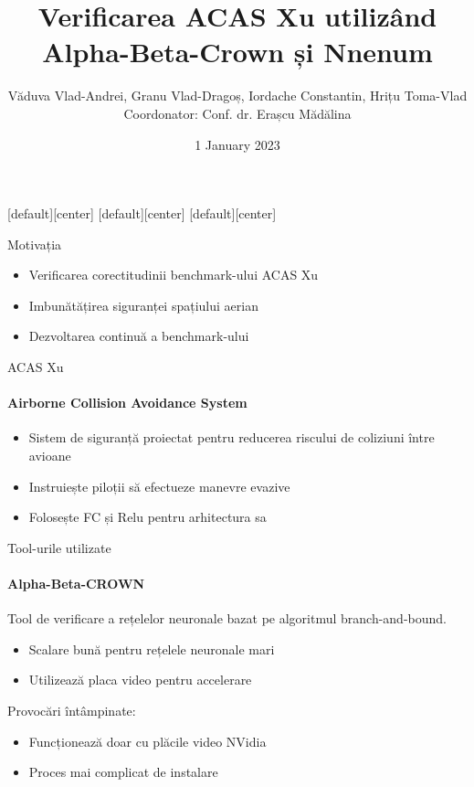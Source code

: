 \documentclass[aspectratio=169]{beamer}
\title{Verificarea ACAS Xu utilizând Alpha-Beta-Crown și Nnenum}
\author{Văduva Vlad-Andrei, Granu Vlad-Dragoș, Iordache Constantin, Hrițu Toma-Vlad
\small Coordonator: Conf. dr. Erașcu Mădălina}
\institute[rtk]{Universitatea de Vest din Timișoara}
\date{1 January 2023}
\begin{document}
  \settitlepagestyle
  
  
  [default][center]
  [default][center]
  [default][center]
  
	\maketitle

  \begin{frame}{Motivația}
    \begin{itemize}
      \item Verificarea corectitudinii benchmark-ului ACAS Xu 
      \newline
      \item Imbunătățirea siguranței spațiului aerian
      \newline
      \item Dezvoltarea continuă a benchmark-ului
      \newline
    \end{itemize}
  \end{frame}
  
  \begin{frame}{ACAS Xu}
        \framesubtitle{Airborne Collision Avoidance System}
  	\begin{itemize}
  		\item Sistem de siguranță proiectat pentru reducerea riscului de coliziuni între avioane
    \newline
  		\item Instruiește piloții să efectueze manevre evazive
    \newline
  		\item Folosește FC și Relu pentru arhitectura sa
    \newline
  	\end{itemize}
  \end{frame}

  \begin{frame}{Tool-urile utilizate}
      \framesubtitle{Alpha-Beta-CROWN}
      Tool de verificare a rețelelor neuronale bazat pe algoritmul branch-and-bound. \newline
      \begin{itemize}
          \item Scalare bună pentru rețelele neuronale mari
          \newline
          \item Utilizează placa video pentru accelerare
          \newline
        \end{itemize}
        Provocări întâmpinate:\newline
        \begin{itemize}
          \item Funcționează doar cu plăcile video NVidia \newline
          \item Proces mai complicat de instalare
      \end{itemize}
  \end{frame}
\end{document}
